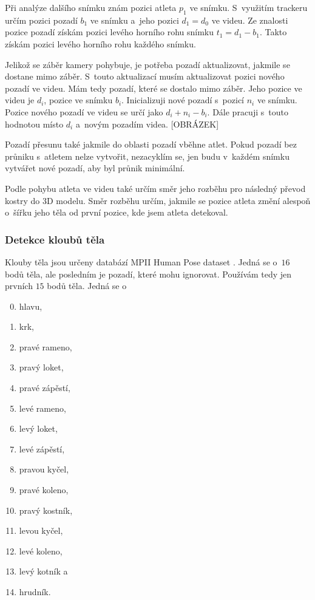 Při analýze dalšího snímku znám pozici atleta $p_1$ ve snímku. S~využitím trackeru určím pozici pozadí $b_1$ ve snímku a~jeho pozici $d_1=d_0$ ve videu. Ze znalosti pozice pozadí získám pozici levého horního rohu snímku $t_1=d_1-b_1$. Takto získám pozici levého horního rohu každého snímku.

Jelikož se záběr kamery pohybuje, je potřeba pozadí aktualizovat, jakmile se dostane mimo záběr. S~touto aktualizací musím aktualizovat pozici nového pozadí ve videu. Mám tedy pozadí, které se dostalo mimo záběr. Jeho pozice ve videu je $d_i$, pozice ve snímku $b_i$. Inicializuji nové pozadí s~pozicí $n_i$ ve snímku. Pozice nového pozadí ve videu se určí jako $d_i+n_i-b_i$. Dále pracuji s~touto hodnotou místo $d_i$ a~novým pozadím videa. [OBRÁZEK]

Pozadí přesunu také jakmile do oblasti pozadí vběhne atlet. Pokud pozadí bez průniku s~atletem nelze vytvořit, nezacyklím se, jen budu v~každém snímku vytvářet nové pozadí, aby byl průnik minimální.

Podle pohybu atleta ve videu také určím směr jeho rozběhu pro následný převod kostry do 3D modelu. Směr rozběhu určím, jakmile se pozice atleta změní alespoň o~šířku jeho těla od první pozice, kde jsem atleta detekoval.


\subsubsection{Detekce kloubů těla}

Klouby těla jsou určeny databází MPII Human Pose dataset \citep{MPIIHPE}. Jedná se o~$16$ bodů těla, ale posledním je pozadí, které mohu ignorovat. Používám tedy jen prvních $15$ bodů těla. Jedná se o
\begin{enumerate}
    \setcounter{enumi}{-1}
    \item hlavu,
    \item krk,
    \item pravé rameno,
    \item pravý loket,
    \item pravé zápěstí,
    \item levé rameno,
    \item levý loket,
    \item levé zápěstí,
    \item pravou kyčel,
    \item pravé koleno,
    \item pravý kostník,
    \item levou kyčel,
    \item levé koleno,
    \item levý kotník a
    \item hrudník.
\end{enumerate}

